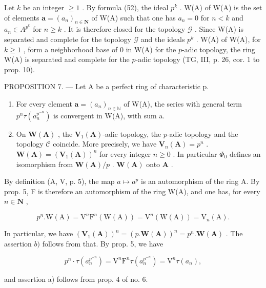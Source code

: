 Let \(k\) be an integer \(\geqslant 1\) . By formula (52), the ideal \(p^{k}\) . W(A) of W(A) is the set of elements \(\boldsymbol{a} = (a_{n})_{n \in \mathbf{N}}\) of W(A) such that one has \(a_{n} = 0\) for \(n < k\) and \(a_{n} \in A^{p^{k}}\) for \(n \geqslant k\) . It is therefore closed for the topology \(\mathcal{G}\) . Since W(A) is separated and complete for the topology \(\mathcal{G}\) and the ideals \(p^{k}\) . W(A) of W(A), for \(k \geqslant 1\) , form a neighborhood base of 0 in W(A) for the \(p\)-adic topology, the ring W(A) is separated and complete for the \(p\)-adic topology (TG, III, p. 26, cor. 1 to prop. 10).

PROPOSITION 7. --- Let A be a perfect ring of characteristic p.

\begin{enumerate}
\def\labelenumi{\alph{enumi})}
\item
  For every element \(\boldsymbol{a} = (a_{n})_{n \in \mathbb{N}}\) of W(A), the series with general term \(p^{n}\tau(a_{n}^{p^{-n}})\) is convergent in W(A), with sum a.
\item
  On \(\mathbf{W}(\mathbf{A})\) , the \(\mathbf{V}_1(\mathbf{A})\)-adic topology, the \(p\)-adic topology and the topology \(\mathcal{C}\) coincide. More precisely, we have \(\mathbf{V}_n(\mathbf{A}) = p^n\) . \(\mathbf{W}(\mathbf{A}) = (\mathbf{V}_1(\mathbf{A}))^n\) for every integer \(n \geqslant 0\) . In particular \(\Phi_0\) defines an isomorphism from \(\mathbf{W}(\mathbf{A})/p\) . \(\mathbf{W}(\mathbf{A})\) onto \(\mathbf{A}\) .
\end{enumerate}

By definition (A, V, p. 5), the map \(a \mapsto a^{p}\) is an automorphism of the ring A. By prop. 5, F is therefore an automorphism of the ring W(A), and one has, for every \(n \in \mathbf{N}\) ,

\[
p ^ {n}. \mathrm{W} (\mathrm{A}) = \mathrm{V} ^ {n} \mathrm{F} ^ {n} (\mathrm{W} (\mathrm{A})) = \mathrm{V} ^ {n} (\mathrm{W} (\mathrm{A})) = \mathrm{V} _ {n} (\mathrm{A}).
\]

In particular, we have \((\mathbf{V}_1(\mathbf{A}))^n = (p.\mathbf{W}(\mathbf{A}))^n = p^n.\mathbf{W}(\mathbf{A})\) . The assertion \(b)\) follows from that. By prop. 5, we have

\[
p ^ {n} \cdot \tau (a _ {n} ^ {p ^ {- n}}) = \mathrm{V} ^ {n} \mathrm{F} ^ {n} \tau (a _ {n} ^ {p ^ {- n}}) = \mathrm{V} ^ {n} \tau (a _ {n}),
\]

and assertion a) follows from prop. 4 of no. 6.

